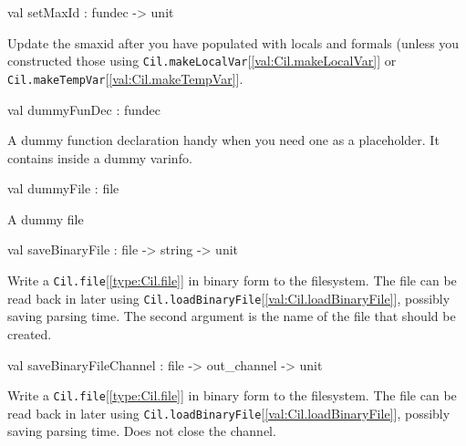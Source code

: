 \documentclass[11pt]{article}
\begin{document}
\label{val:Cil.setMaxId}\begin{ocamldoccode}
val setMaxId : fundec -> unit
\end{ocamldoccode}
\begin{ocamldocdescription}
Update the smaxid after you have populated with locals and formals 
 (unless you constructed those using {\tt{Cil.makeLocalVar}}[\ref{val:Cil.makeLocalVar}] or 
 {\tt{Cil.makeTempVar}}[\ref{val:Cil.makeTempVar}].


\end{ocamldocdescription}




\label{val:Cil.dummyFunDec}\begin{ocamldoccode}
val dummyFunDec : fundec
\end{ocamldoccode}
\begin{ocamldocdescription}
A dummy function declaration handy when you need one as a placeholder. It 
 contains inside a dummy varinfo.


\end{ocamldocdescription}




\label{val:Cil.dummyFile}\begin{ocamldoccode}
val dummyFile : file
\end{ocamldoccode}
\begin{ocamldocdescription}
A dummy file


\end{ocamldocdescription}




\label{val:Cil.saveBinaryFile}\begin{ocamldoccode}
val saveBinaryFile : file -> string -> unit
\end{ocamldoccode}
\begin{ocamldocdescription}
Write a {\tt{Cil.file}}[\ref{type:Cil.file}] in binary form to the filesystem. The file can be
 read back in later using {\tt{Cil.loadBinaryFile}}[\ref{val:Cil.loadBinaryFile}], possibly saving parsing
 time. The second argument is the name of the file that should be
 created.


\end{ocamldocdescription}




\label{val:Cil.saveBinaryFileChannel}\begin{ocamldoccode}
val saveBinaryFileChannel : file -> out_channel -> unit
\end{ocamldoccode}
\begin{ocamldocdescription}
Write a {\tt{Cil.file}}[\ref{type:Cil.file}] in binary form to the filesystem. The file can be
 read back in later using {\tt{Cil.loadBinaryFile}}[\ref{val:Cil.loadBinaryFile}], possibly saving parsing
 time. Does not close the channel.


\end{ocamldocdescription}
\end{document}
